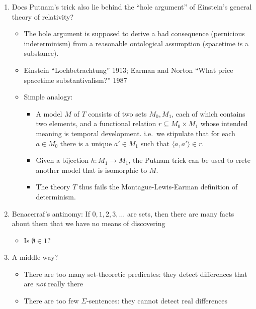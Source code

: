 \documentclass[fleqn]{tufte-handout}
\begin{document}
\begin{enumerate}
  \begin{itemize}
  \item Hilbert, Burgess, Linnebo (hermeneutic structuralism): Pure
    mathematicians are trained to ignore the differences between $M$
    and $N$. It's not the fault of ZF if an untrained person takes $M$
    and $N$ to represent different situations.
  \end{itemize}

\item Does Putnam's trick also lie behind the ``hole argument'' of
  Einstein's general theory of relativity?

  \begin{itemize}
  \item The hole argument is supposed to derive a bad consequence
    (pernicious indeterminism) from a reasonable ontological
    assumption (spacetime is a substance).
  \item Einstein ``Lochbetrachtung'' 1913; Earman and Norton ``What
    price spacetime substantivalism?'' 1987
  \item Simple analogy:
    \begin{itemize}
    \item A model $M$ of $T$ consists of two sets $M_0,M_1$, each of
      which contains two elements, and a functional relation
      $r\subseteq M_0\times M_1$ whose intended meaning is temporal
      development. i.e.\ we stipulate that for each $a\in M_0$ there
      is a unique $a'\in M_1$ such that $\langle a,a'\rangle \in r$.
    \item Given a bijection $h:M_1\to M_1$, the Putnam trick can be
      used to crete another model that is isomorphic to
      $M$.
    \item The theory $T$ thus fails the Montague-Lewis-Earman
      definition of determinism. \end{itemize}
  \end{itemize}
  
\item Benacerraf's antinomy: If $0,1,2,3,\dots $ are sets, then there
  are many facts about them that we have no means of discovering

  \begin{itemize}
  \item Is $\emptyset\in 1$?
  \end{itemize}
  
\item A middle way?

  \begin{itemize}
  \item There are too many set-theoretic predicates: they detect
    differences that are \emph{not} really there
  \item There are too few $\Sigma$-sentences: they cannot detect real
    differences
    \begin{itemize}
    

\end{itemize}
\end{itemize}
\end{enumerate}
\end{document}
